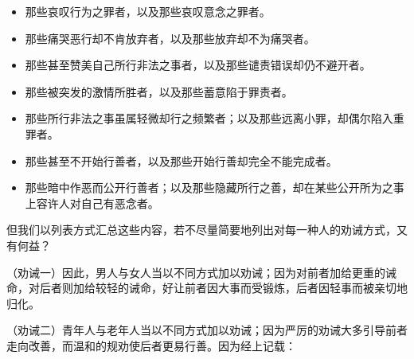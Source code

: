 \begin{itemize}
\item 那些哀叹行为之罪者，以及那些哀叹意念之罪者。
\end{itemize}

\begin{itemize}
\item 那些痛哭恶行却不肯放弃者，以及那些放弃却不为痛哭者。
\end{itemize}

\begin{itemize}
\item 那些甚至赞美自己所行非法之事者，以及那些谴责错误却仍不避开者。
\end{itemize}

\begin{itemize}
\item 那些被突发的激情所胜者，以及那些蓄意陷于罪责者。
\end{itemize}

\begin{itemize}
\item 那些所行非法之事虽属轻微却行之频繁者；以及那些远离小罪，却偶尔陷入重罪者。
\end{itemize}

\begin{itemize}
\item 那些甚至不开始行善者，以及那些开始行善却完全不能完成者。
\end{itemize}

\begin{itemize}
\item 那些暗中作恶而公开行善者；以及那些隐藏所行之善，却在某些公开所为之事上容许人对自己有恶念者。
\end{itemize}

但我们以列表方式汇总这些内容，若不尽量简要地列出对每一种人的劝诫方式，又有何益？\par

（劝诫一）因此，男人与女人当以不同方式加以劝诫；因为对前者加给更重的诫命，对后者则加给较轻的诫命，好让前者因大事而受锻炼，后者因轻事而被亲切地归化。\par

（劝诫二）青年人与老年人当以不同方式加以劝诫；因为严厉的劝诫大多引导前者走向改善，而温和的规劝使后者更易行善。因为经上记载：\par


